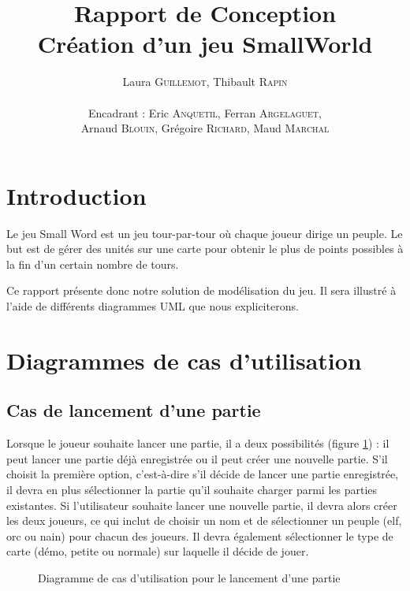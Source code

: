 \documentclass[a4paper]{article}
\title{\textbf{Rapport de Conception} \\ Création d'un jeu SmallWorld}
\author{Laura \textsc{Guillemot}, Thibault \textsc{Rapin}\\
		\\
        Encadrant : Eric \textsc{Anquetil}, Ferran \textsc{Argelaguet},\\
        Arnaud \textsc{Blouin}, Grégoire \textsc{Richard}, Maud \textsc{Marchal}}
\begin{document}
\maketitle
\thispagestyle{empty}

\newpage
\tableofcontents
\newpage

\section*{Introduction}

Le jeu Small Word est un jeu tour-par-tour où chaque joueur dirige un peuple. Le but est de gérer des unités sur une carte pour obtenir le plus de points possibles à la fin d’un certain nombre de tours.

Ce rapport présente donc notre solution de modélisation du jeu. Il sera illustré à l’aide de différents diagrammes UML que nous expliciterons.



\section{Diagrammes de cas d'utilisation}

\subsection{Cas de lancement d’une partie}

Lorsque le joueur souhaite lancer une partie, il a deux possibilités (figure \ref{usecasecreate}) : il peut lancer une partie déjà enregistrée ou il peut créer une nouvelle partie.
S’il choisit la première option, c’est-à-dire s’il décide de lancer une partie enregistrée, il devra en plus sélectionner la partie qu’il souhaite charger parmi les parties existantes.
Si l’utilisateur souhaite lancer une nouvelle partie, il devra alors créer les deux joueurs, ce qui inclut de choisir un nom et de sélectionner un peuple (elf, orc ou nain) pour chacun des joueurs. Il devra également sélectionner le type de carte (démo, petite ou normale) sur laquelle il décide de jouer.

\begin{figure}[!h] 
  \begin{center}
    \caption{Diagramme de cas d'utilisation pour le lancement d'une partie} 
    \label{usecasecreate} 
  \end{center}
\end{figure}
\end{document}
